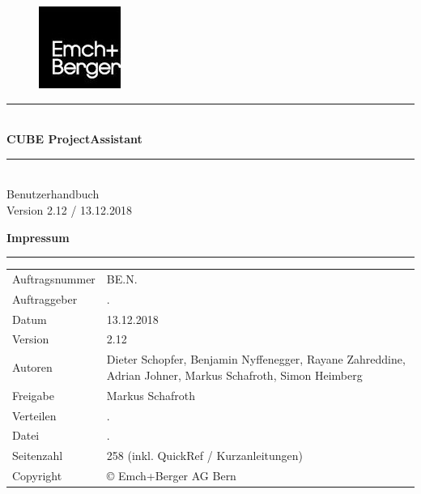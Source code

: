 \documentclass[12pt]{article} %
\newcommand{\HRule}{\rule{\linewidth}{0.5mm}} %
\begin{document}

\begin{titlepage}


\begin{figure}[t] %
\flushright  %
\includegraphics[width=0.2\linewidth]{0_EmBeLogo}
\end{figure}

\vspace*{6cm}

\center %

\HRule \\[0.4cm]
{ \huge \bfseries CUBE ProjectAssistant}\\[0.4cm] %
\HRule \\[1.5cm]

\textsf{\Large Benutzerhandbuch}\\[0.5cm] %
\textsf{\large Version 2.12 / 13.12.2018}\\[0.5cm] %

\pagebreak

\flushleft\textbf{ Impressum}
\rule{\textwidth}{1pt}
\begin{flushright}
\begin{flushleft}

\end{flushleft}
\end{flushright}
\begin{tabular}{lp{12cm}}
Auftragsnummer & BE.N.\\
Auftraggeber & .\\
Datum & 13.12.2018\\
Version & 2.12\\
Autoren & Dieter Schopfer, Benjamin Nyffenegger, Rayane Zahreddine, Adrian Johner, Markus Schafroth, Simon Heimberg\\
Freigabe & Markus Schafroth\\
Verteilen & .\\
Datei & .\\
Seitenzahl & 258 (inkl. QuickRef / Kurzanleitungen)\\
Copyright & \copyright{ Emch+Berger AG Bern}\\
\end{tabular}

\vfill %

\end{titlepage}
\end{document}
